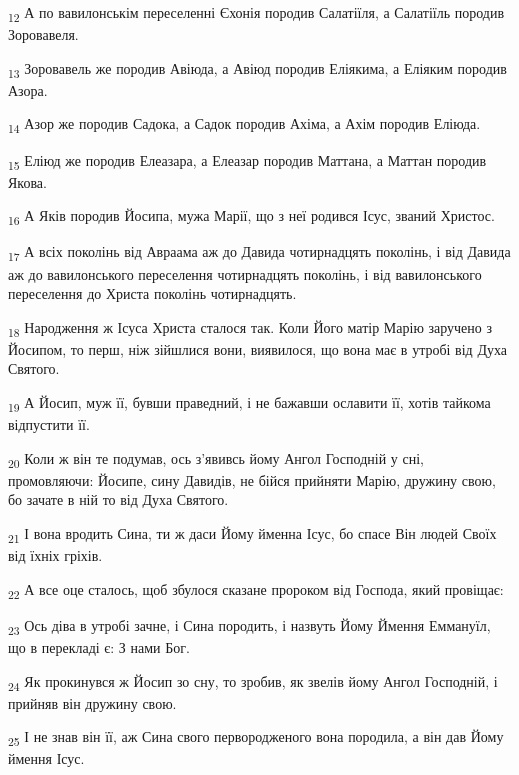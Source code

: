 \begin{tcolorbox}
\textsubscript{12} А по вавилонськім переселенні Єхонія породив Салатіїля, а Салатіїль породив Зоровавеля.
\end{tcolorbox}
\begin{tcolorbox}
\textsubscript{13} Зоровавель же породив Авіюда, а Авіюд породив Еліякима, а Еліяким породив Азора.
\end{tcolorbox}
\begin{tcolorbox}
\textsubscript{14} Азор же породив Садока, а Садок породив Ахіма, а Ахім породив Еліюда.
\end{tcolorbox}
\begin{tcolorbox}
\textsubscript{15} Еліюд же породив Елеазара, а Елеазар породив Маттана, а Маттан породив Якова.
\end{tcolorbox}
\begin{tcolorbox}
\textsubscript{16} А Яків породив Йосипа, мужа Марії, що з неї родився Ісус, званий Христос.
\end{tcolorbox}
\begin{tcolorbox}
\textsubscript{17} А всіх поколінь від Авраама аж до Давида чотирнадцять поколінь, і від Давида аж до вавилонського переселення чотирнадцять поколінь, і від вавилонського переселення до Христа поколінь чотирнадцять.
\end{tcolorbox}
\begin{tcolorbox}
\textsubscript{18} Народження ж Ісуса Христа сталося так. Коли Його матір Марію заручено з Йосипом, то перш, ніж зійшлися вони, виявилося, що вона має в утробі від Духа Святого.
\end{tcolorbox}
\begin{tcolorbox}
\textsubscript{19} А Йосип, муж її, бувши праведний, і не бажавши ославити її, хотів тайкома відпустити її.
\end{tcolorbox}
\begin{tcolorbox}
\textsubscript{20} Коли ж він те подумав, ось з'явивсь йому Ангол Господній у сні, промовляючи: Йосипе, сину Давидів, не бійся прийняти Марію, дружину свою, бо зачате в ній то від Духа Святого.
\end{tcolorbox}
\begin{tcolorbox}
\textsubscript{21} І вона вродить Сина, ти ж даси Йому йменна Ісус, бо спасе Він людей Своїх від їхніх гріхів.
\end{tcolorbox}
\begin{tcolorbox}
\textsubscript{22} А все оце сталось, щоб збулося сказане пророком від Господа, який провіщає:
\end{tcolorbox}
\begin{tcolorbox}
\textsubscript{23} Ось діва в утробі зачне, і Сина породить, і назвуть Йому Ймення Еммануїл, що в перекладі є: З нами Бог.
\end{tcolorbox}
\begin{tcolorbox}
\textsubscript{24} Як прокинувся ж Йосип зо сну, то зробив, як звелів йому Ангол Господній, і прийняв він дружину свою.
\end{tcolorbox}
\begin{tcolorbox}
\textsubscript{25} І не знав він її, аж Сина свого первородженого вона породила, а він дав Йому ймення Ісус.
\end{tcolorbox}
